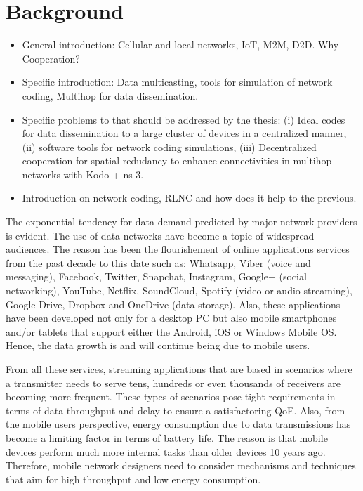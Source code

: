\section{Background}\label{sec:background}

\begin{itemize}
\item General introduction: Cellular and local networks, \ac{IoT}, \ac{M2M}, \ac{D2D}. Why Cooperation?
\item Specific introduction: Data multicasting, tools for simulation of network coding, Multihop for data dissemination.
\item Specific problems to that should be addressed by the thesis: (i) Ideal codes for data dissemination to a large cluster of devices in a centralized manner, (ii) software tools for network coding simulations, (iii) Decentralized cooperation for spatial redudancy to enhance connectivities in multihop networks with Kodo + ns-3.
\item Introduction on network coding, RLNC and how does it help to the previous.
\end{itemize}

The exponential tendency for data demand predicted by major network providers \cite{cisco2016forecast} is evident. The use of data networks have become a topic of widespread audiences. The reason has been the flourishement of online applications services from the past decade to this date such as:  Whatsapp, Viber (voice and messaging), Facebook, Twitter, Snapchat, Instagram, Google+ (social networking), YouTube, Netflix, SoundCloud, Spotify (video or audio streaming), Google Drive, Dropbox and OneDrive (data storage). Also, these applications have been developed not only for a desktop \ac{PC} but also mobile smartphones and/or tablets that support either the Android, iOS or Windows Mobile \ac{OS}. Hence, the data growth is and will continue being due to mobile users.

From all these services, streaming applications that are based in scenarios where a transmitter needs to serve tens, hundreds or even thousands of receivers are becoming more frequent. These types of scenarios pose tight requirements in terms of data throughput and delay to ensure a satisfactoring \ac{QoE}. Also, from the mobile users perspective, energy consumption due to data transmissions has become a limiting factor in terms of battery life. The reason is that mobile devices perform much more internal tasks than older devices 10 years ago. Therefore, mobile network designers need to consider mechanisms and techniques that aim for high throughput and low energy consumption.

